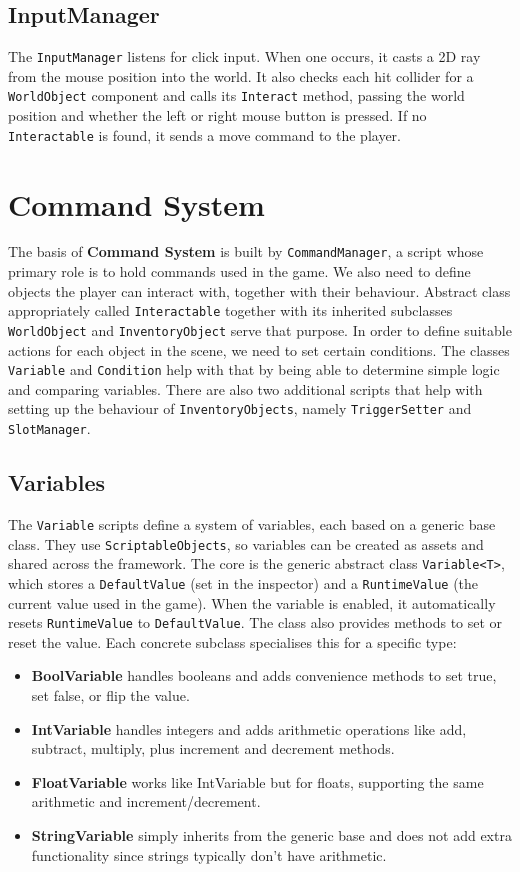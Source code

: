\subsection{InputManager}
The \verb|InputManager| listens for click input. When one occurs, it casts a 2D ray from the mouse position into the world. It also checks each hit collider for a \verb|WorldObject| component and calls its \verb|Interact| method, passing the world position and whether the left or right mouse button is pressed. If no \verb|Interactable| is found, it sends a move command to the player.

\section{Command System}
\label{CommandSystem}
The basis of \textbf{Command System} is built by \verb|CommandManager|, a script whose primary role is to hold commands used in the game. We also need to define objects the player can interact with, together with their behaviour.  Abstract class appropriately called \verb|Interactable| together with its inherited subclasses \verb|WorldObject| and \verb|InventoryObject| serve that purpose. In order to define suitable actions for each object in the scene, we need to set certain conditions. The classes \verb|Variable| and \verb|Condition| help with that by being able to determine simple logic and comparing variables. There are also two additional scripts that help with setting up the behaviour of \verb|InventoryObjects|, namely \verb|TriggerSetter| and \verb|SlotManager|.

\subsection{Variables}
The \verb|Variable| scripts define a system of variables, each based on a generic base class. They use \verb|ScriptableObjects|, so variables can be created as assets and shared across the framework. The core is the generic abstract class \verb|Variable<T>|, which stores a \verb|DefaultValue| (set in the inspector) and a \verb|RuntimeValue| (the current value used in the game). When the variable is enabled, it automatically resets \verb|RuntimeValue| to \verb|DefaultValue|. The class also provides methods to set or reset the value. Each concrete subclass specialises this for a specific type:

\begin{itemize}
    \item \textbf{BoolVariable} handles booleans and adds convenience methods to set true, set false, or flip the value.
    \item \textbf{IntVariable} handles integers and adds arithmetic operations like add, subtract, multiply, plus increment and decrement methods.
    \item \textbf{FloatVariable} works like IntVariable but for floats, supporting the same arithmetic and increment/decrement.
    \item \textbf{StringVariable} simply inherits from the generic base and does not add extra functionality since strings typically don't have arithmetic.
\end{itemize}

